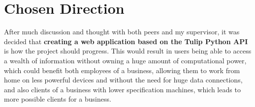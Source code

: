 \documentclass[../dissertation.tex]{subfiles}
\begin{document}
\section{Chosen Direction}

After much discussion and thought with both peers and my supervisor, it was decided that \textbf{creating a web application based on the Tulip Python API} is how the project should progress. This would result in users being able to access a wealth of information without owning a huge amount of computational power, which could benefit both employees of a business, allowing them to work from home on less powerful devices and without the need for huge data connections, and also clients of a business with lower specification machines, which leads to more possible clients for a business.
\end{document}
